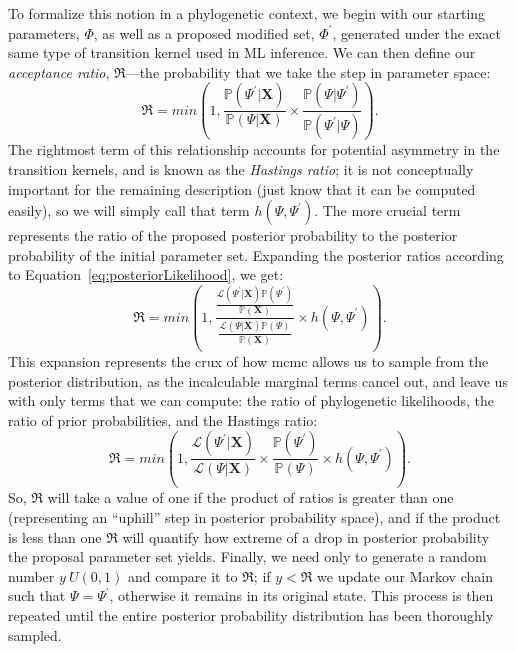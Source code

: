 To formalize this notion in a phylogenetic context, we begin with our starting parameters, $\Phi$, as well as a proposed modified set, $\Phi^{\prime}$, generated under the exact same type of transition kernel used in ML inference.
We can then define our \textit{acceptance ratio}, $\mathfrak{R}$---the probability that we take the step in parameter space:
\begin{equation}
  \mathfrak{R} = 
    min \left( 1, \frac{\mathbb{P}(\Psi^{\prime}|\mathbf{X})}
                       {\mathbb{P}(\Psi|\mathbf{X})} \times 
                         \frac{\mathbb{P}(\Psi|\Psi^{\prime})}
                              {\mathbb{P}(\Psi^{\prime}|\Psi)} \right).
\end{equation}
The rightmost term of this relationship accounts for potential asymmetry in the transition kernels, and is known as the \textit{Hastings ratio}; it is not conceptually important for the remaining description (just know that it can be computed easily), so we will simply call that term $h(\Psi,\Psi^{\prime})$.
The more crucial term represents the ratio of the proposed posterior probability to the posterior probability of the initial parameter set.
Expanding the posterior ratios according to Equation~\ref{eq:posteriorLikelihood}, we get:
\begin{equation}
  \mathfrak{R} =
    min \left( 1, \frac{\frac{\mathcal{L}(\Psi^{\prime}|\mathbf{X}) \mathbb{P}(\Psi^{\prime})}
                             {\mathbb{P}(\mathbf{X})}}
                       {\frac{\mathcal{L}(\Psi|\mathbf{X}) \mathbb{P}(\Psi)}
                             {\mathbb{P}(\mathbf{X})}}
                       \times h(\Psi,\Psi^{\prime}) \right).
\end{equation}
This expansion represents the crux of how \gls{mcmc} allows us to sample from the posterior distribution, as the incalculable marginal terms cancel out, and leave us with only terms that we can compute: the ratio of phylogenetic likelihoods, the ratio of prior probabilities, and the Hastings ratio:
\begin{equation}
  \mathfrak{R} =
    min \left( 1, \frac{\mathcal{L}(\Psi^{\prime}|\mathbf{X})}
                       {\mathcal{L}(\Psi|\mathbf{X})}
                  \times
                  \frac{\mathbb{P}(\Psi^{\prime})}
                       {\mathbb{P}(\Psi)}
                  \times
                  h(\Psi,\Psi^{\prime}) \right).
\end{equation}
So, $\mathfrak{R}$ will take a value of one if the product of ratios is greater than one (representing an ``uphill'' step in posterior probability space), and if the product is less than one $\mathfrak{R}$ will quantify how extreme of a drop in posterior probability the proposal parameter set yields.
Finally, we need only to generate a random number $y~U(0,1)$ and compare it to $\mathfrak{R}$; if $y < \mathfrak{R}$ we update our Markov chain such that $\Psi = \Psi^{\prime}$, otherwise it remains in its original state.
This process is then repeated until the entire posterior probability distribution has been thoroughly sampled.

